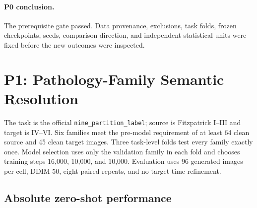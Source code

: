 \documentclass{article}
\newcommand{\KT}{K_T}
\begin{document}
\paragraph{P0 conclusion.}
The prerequisite gate passed.  Data provenance, exclusions, task folds, frozen checkpoints,
seeds, comparison direction, and independent statistical units were fixed before the new
outcomes were inspected.

\section{P1: Pathology-Family Semantic Resolution}

The task is the official \texttt{nine\_partition\_label}; source is Fitzpatrick I--III and
target is IV--VI.  Six families meet the pre-model requirement of at least 64 clean source
and 45 clean target images.  Three task-level folds test every family exactly once.  Model
selection uses only the validation family in each fold and chooses training steps 16,000,
10,000, and 10,000.  Evaluation uses 96 generated images per cell, DDIM-50, eight paired
repeats, and no target-time refinement.

\subsection{Absolute zero-shot performance}

\begin{table}[h]
\caption{P1 raw performance at $\KT=0$ over six outer-test pathology families.  Entries are
absolute family means $\pm$ 95\% CI.  Phenotype share and family consistency are
higher-is-better; all three distances are lower-is-better.}
\label{tab:p1raw}
\centering
\scriptsize
{}
\end{table}
\end{document}
